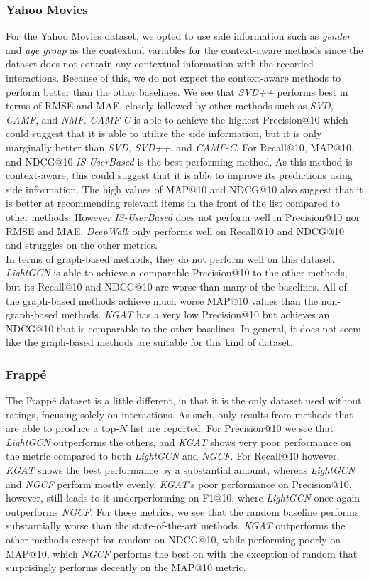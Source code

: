 \subsubsection{Yahoo Movies}
For the Yahoo Movies dataset, we opted to use side information such as \textit{gender} and \textit{age group} as the contextual variables for the context-aware methods since the dataset does not contain any contextual information with the recorded interactions.
Because of this, we do not expect the context-aware methods to perform better than the other baselines.
We see that \textit{SVD++} performs best in terms of RMSE and MAE, closely followed by other methods such as \textit{SVD}, \textit{CAMF}, and \textit{NMF}.
\textit{CAMF-C} is able to achieve the highest Precision@10 which could suggest that it is able to utilize the side information, but it is only marginally better than \textit{SVD}, \textit{SVD++}, and \textit{CAMF-C}.
For Recall@10, MAP@10, and NDCG@10 \textit{IS-UserBased} is the best performing method.
As this method is context-aware, this could suggest that it is able to improve its predictions using side information.
The high values of MAP@10 and NDCG@10 also suggest that it is better at recommending relevant items in the front of the list compared to other methods.
However \textit{IS-UserBased} does not perform well in Precision@10 nor RMSE and MAE.
\textit{DeepWalk} only performs well on Recall@10 and NDCG@10 and struggles on the other metrics.
\\
In terms of graph-based methods, they do not perform well on this dataset.
\textit{LightGCN} is able to achieve a comparable Precision@10 to the other methods, but its Recall@10 and NDCG@10 are worse than many of the baselines.
All of the graph-based methods achieve much worse MAP@10 values than the non-graph-based methods.
\textit{KGAT} has a very low Precision@10 but achieves an NDCG@10 that is comparable to the other baselines.
In general, it does not seem like the graph-based methods are suitable for this kind of dataset.

\subsubsection{Frappé}
The Frappé dataset is a little different, in that it is the only dataset used without ratings, focusing solely on interactions.
As such, only results from methods that are able to produce a top-$N$ list are reported.
For Precision@10 we see that \textit{LightGCN} outperforms the others, and \textit{KGAT} shows very poor performance on the metric compared to both \textit{LightGCN} and \textit{NGCF}.
For Recall@10 however, \textit{KGAT} shows the best performance by a substantial amount, whereas \textit{LightGCN} and \textit{NGCF} perform mostly evenly.
\textit{KGAT}'s poor performance on Precision@10, however, still leads to it underperforming on F1@10, where \textit{LightGCN} once again outperforms \textit{NGCF}.
For these metrics, we see that the random baseline performs substantially worse than the state-of-the-art methods.
\textit{KGAT} outperforms the other methods except for random on NDCG@10, while performing poorly on MAP@10, which \textit{NGCF} performs the best on with the exception of random that surprisingly performs decently on the MAP@10 metric.
